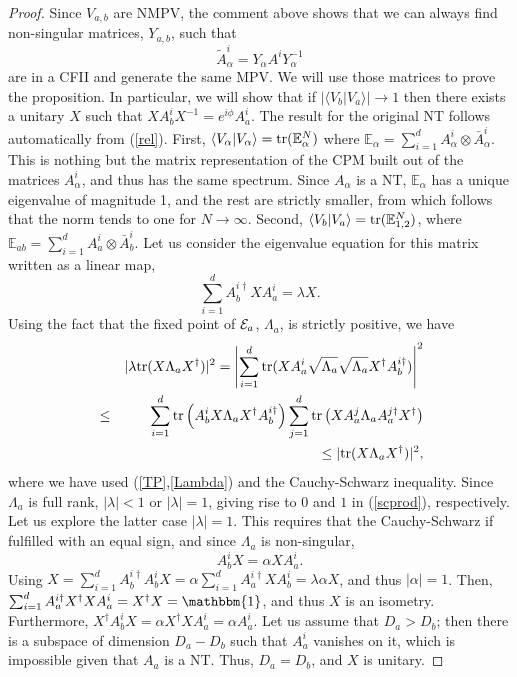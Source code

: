 \documentclass{elsarticle}
\newcommand{\Id}{\mathbbm{1}}
\newcommand{\be}{\begin{equation}}
\newcommand{\ee}{\end{equation}}
\newcommand{\bea}{\begin{eqnarray}}
\newcommand{\eea}{\end{eqnarray}}
\begin{document}
\begin{proof}
Since  $V_{a,b}$ are NMPV, the comment above shows that we can always find non-singular matrices, $Y_{a,b}$, such that
 \be
 \label{rel}
 \tilde A^i_\alpha=Y_\alpha A^i Y_\alpha^{-1}
 \ee
are in a CFII and generate the same MPV. We will use those matrices to prove the proposition. In particular, we will show that if $|\langle V_b|V_a\rangle|\to 1$ then there exists a unitary $X$ such that $X A^i_b X^{-1}= e^{i\phi} A^i_a$. The result for the original NT follows automatically from (\ref{rel}). First, $\langle V_\alpha|V_\alpha\rangle={\rm tr}(\mathbb{E}_\alpha^N)$ where $\mathbb{E}_\alpha=\sum_{i=1}^d A_\alpha^i\otimes \bar A_\alpha^i$. This is nothing but the matrix representation of the CPM built out of the matrices $A^i_\alpha$, and thus has the same spectrum. Since $A_\alpha$ is a NT, $\mathbb{E}_\alpha$ has a unique eigenvalue of magnitude 1, and the rest are strictly smaller, from which follows that the norm tends to one for $N\to\infty$. Second, $\langle V_b|V_a\rangle={\rm tr}(\mathbb{E}_{1,2}^N)$, where
$\mathbb{E}_{ab}=\sum_{i=1}^d A_a^i\otimes \bar A_b^i$. Let us consider the eigenvalue equation for this matrix written as a linear map,
 \be
 \sum_{i=1}^d A_b^{i\dagger} X A_a^{i}=\lambda X.
 \ee
Using the fact that the fixed point of ${\cal E}_a$, $\Lambda_a$, is strictly positive, we have
 \bea
 &&|\lambda {\rm tr}(X \Lambda_a X^\dagger)|^2 = \left|\sum_{i=1}^d {\rm tr}(X A^i_a \sqrt{\Lambda_a} \sqrt{\Lambda_a} X^\dagger A_b^{i\dagger})\right|^2 \nonumber\\
 &\le& \sum_{i=1}^d {\rm tr}\left(A^i_b X \Lambda_a X^\dagger A_b^{i\dagger}\right)
 \sum_{j=1}^d {\rm tr}\left(X A^j_a \Lambda_a A_a^{j\dagger}X^\dagger\right)\nonumber\\
 && \le |{\rm tr}(X\Lambda_a X^\dagger)|^2,\nonumber
 \eea
where we have used (\ref{TP},\ref{Lambda}) and the Cauchy-Schwarz inequality. Since $\Lambda_a$ is full rank, $|\lambda|< 1$ or $|\lambda|=1$, giving rise to $0$ and $1$ in (\ref{scprod}), respectively. Let us explore the latter case $|\lambda|=1$. This requires that the Cauchy-Schwarz if fulfilled with an equal sign, and since $\Lambda_a$ is non-singular,
 \be
 A^i_b X = \alpha X A^i_a.
 \ee
Using $X=\sum_{i=1}^d A^{i\dagger}_b A^i_b X =\alpha \sum_{i=1}^d A^{i\dagger}_aXA^i_b=\lambda \alpha X$, and thus $|\alpha|=1$. Then, $\sum_{i=1}^d A^{i\dagger}_aX^\dagger X A^i_a=X^\dagger X =\Id$, and thus $X$ is an isometry. Furthermore, $X^\dagger A_b^i X = \alpha X^\dagger X A^i_a=\alpha A^i_a$. Let us assume that $D_a> D_b$; then there is a subspace
of dimension $D_a-D_b$ such that $A^i_a$ vanishes on it, which is impossible given that $A_a$ is a NT. Thus, $D_a=D_b$, and $X$ is unitary.
\end{proof}
\end{document}
